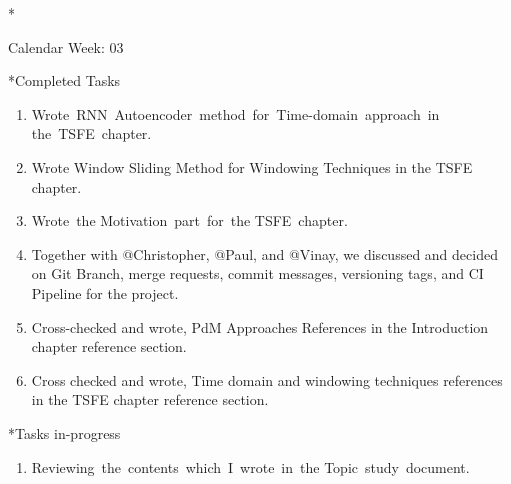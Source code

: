 \documentclass[11pt,a4paper]{article}
\begin{document}
\newpage
\begin{section}*{Calendar Week: 03 \hfill \date{22 January, 2021}}
 \begin{subsection}*{Completed Tasks}
     \begin{enumerate}
         \item
               Wrote RNN Autoencoder method for Time-domain approach in the TSFE chapter.
         \item
               Wrote Window Sliding Method for Windowing Techniques in the TSFE chapter.
         \item
               Wrote the Motivation part for the TSFE chapter.
         \item
               Together with @Christopher, @Paul, and @Vinay, we discussed and decided on Git Branch, merge requests, commit messages, versioning tags, and CI Pipeline for the project.
         \item
               Cross-checked and wrote, PdM Approaches References in the Introduction chapter reference section.
         \item
               Cross checked and wrote, Time domain and windowing techniques references in the TSFE chapter reference section.
     \end{enumerate}
 \end{subsection}

 \begin{subsection}*{Tasks in-progress}
     \begin{enumerate}
         \item
               Reviewing the contents which I wrote in the Topic study document.
     \end{enumerate}
 \end{subsection}
\end{section}
\end{document}
